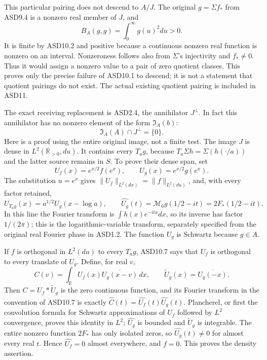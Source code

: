 This particular pairing does not descend to \(A/J\). The original
\(g=\Sigma f_*\) from ASD9.4 is a nonzero real member of \(J\), and \[
 B_A(g,g)=\int_0^\infty g(u)^2du>0.
 \tag{ASD10.5}
\] It is finite by ASD10.2 and positive because a continuous nonzero
real function is nonzero on an interval. Nonzeroness follows also from
\(\Sigma\)'s injectivity and \(f_*\ne0\). Thus it would assign a nonzero
value to a pair of zero quotient classes. This proves only the precise
failure of ASD10.1 to descend; it is not a statement that quotient
pairings do not exist. The actual existing quotient pairing is included
in ASD11.

The exact receiving replacement is ASD2.4, the annihilator \(J^\perp\).
In fact this annihilator has no nonzero element of the form
\(\mathfrak I_A(b)\): \[
 \mathfrak I_A(A)\cap J^\perp=\{0\}.
 \tag{ASD10.6}
\] Here is a proof using the entire original image, not a finite test.
The image \(J\) is dense in \(L^2(\mathbb R_{>0},du)\). It contains
every \(T_ag\), because \(T_a\Sigma h=\Sigma(h(\cdot/a))\) and the
latter source remains in \(S\). To prove their dense span, set \[
 U_f(x)=e^{x/2}f(e^x),\qquad U_g(x)=e^{x/2}g(e^x).
\] The substitution \(u=e^x\) gives
\(\|U_f\|_{L^2(dx)}=\|f\|_{L^2(du)}\), and, with every factor retained,
\[
 U_{T_ag}(x)=a^{1/2}U_g(x-\log a),\qquad
 \widehat{U_g}(t)
 =\mathcal M_0g(1/2-it)=2F_*(1/2-it).
 \tag{ASD10.7}
\] In this line the Fourier transform is \(\int h(x)e^{-itx}dx\), so its
inverse has factor \(1/(2\pi)\); this is the logarithmic-variable
transform, separately specified from the original real Fourier phase in
ASD1.2. The function \(U_g\) is Schwartz because \(g\in A\).

If \(f\) is orthogonal in \(L^2(du)\) to every \(T_ag\), ASD10.7 says
that \(U_f\) is orthogonal to every translate of \(U_g\). Define, for
real \(v\), \[
 C(v)=\int_{\mathbb R}U_f(x)\overline{U_g(x-v)}\,dx,
 \qquad \widetilde U_g(x)=\overline{U_g(-x)}.
\] Then \(C=U_f*\widetilde U_g\) is the zero continuous function, and
its Fourier transform in the convention of ASD10.7 is exactly
\(\widehat C(t)=\widehat{U_f}(t)\overline{\widehat{U_g}(t)}\).
Plancherel, or first the convolution formula for Schwartz approximations
of \(U_f\) followed by \(L^2\) convergence, proves this identity in
\(L^2\); \(\widehat{U_g}\) is bounded and \(\widetilde U_g\) is
integrable. The entire nonzero function \(2F_*\) has only isolated
zeros, so \(\widehat{U_g}(t)\ne0\) for almost every real \(t\). Hence
\(\widehat{U_f}=0\) almost everywhere, and \(f=0\). This proves the
density assertion.

